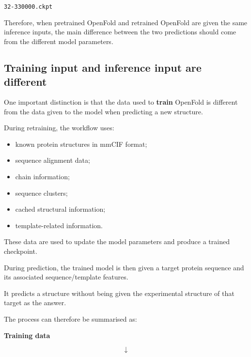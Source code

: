 \documentclass[11pt,a4paper]{article}
\begin{document}
\begin{center}
\texttt{32-330000.ckpt}
\end{center}

Therefore, when pretrained OpenFold and retrained OpenFold are given the same inference inputs, the main difference between the two predictions should come from the different model parameters.


\subsection{Training input and inference input are different}

One important distinction is that the data used to \textbf{train} OpenFold is different from the data given to the model when predicting a new structure.

During retraining, the workflow uses:

\begin{itemize}[leftmargin=*]

    \item known protein structures in mmCIF format;

    \item sequence alignment data;

    \item chain information;

    \item sequence clusters;

    \item cached structural information;

    \item template-related information.

\end{itemize}

These data are used to update the model parameters and produce a trained checkpoint.

During prediction, the trained model is then given a target protein sequence and its associated sequence/template features.

It predicts a structure without being given the experimental structure of that target as the answer.

The process can therefore be summarised as:

\begin{center}
\textbf{Training data}
\end{center}

\[
\downarrow
\]
\end{document}
